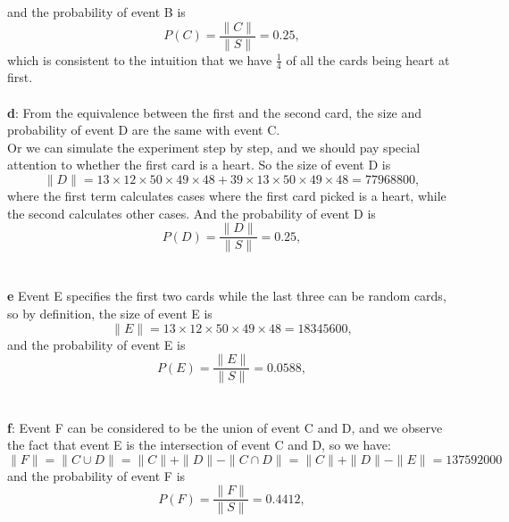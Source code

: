 \documentclass[12pt,letterpaper]{article}
\begin{document}
    and the probability of event B is
        \begin{equation}
            P(C) = \frac{\|C\|}{\|S\|} = 0.25,
        \end{equation}
    which is consistent to the intuition that we have $\frac{1}{4}$ of all the cards being heart at first.
    \\ \\
    \textbf{d}: From the equivalence between the first and the second card, the size and probability of event D are the same with event C.\\
    Or we can simulate the experiment step by step, and we should pay special attention to whether the first card is a heart. So the size of event D is
        \begin{equation}
            \|D\| = 13 \times 12 \times 50 \times 49 \times 48 + 39 \times 13 \times 50 \times 49 \times 48 = 77968800,
        \end{equation}
    where the first term calculates cases where the first card picked is a heart, while the second calculates other cases. And the probability of event D is
        \begin{equation}
            P(D) = \frac{\|D\|}{\|S\|} = 0.25,
        \end{equation}
    \\ \\
    \textbf{e} Event E specifies the first two cards while the last three can be random cards, so by definition, the size of event E is
        \begin{equation}
            \|E\| = 13 \times 12 \times 50 \times 49 \times 48 = 18345600,
        \end{equation}
    and the probability of event E is
       \begin{equation}
           P(E) = \frac{\|E\|}{\|S\|} = 0.0588,
       \end{equation}
    \\ \\
    \textbf{f}: Event F can be considered to be the union of event C and D, and we observe the fact that event E is the intersection of event C and D, so we have:
        \begin{equation}
            \|F\| = \|C \cup D\| = \|C\| + \|D\| - \|C \cap D\| = \|C\| + \|D\| - \|E\| = 137592000
        \end{equation}
    and the probability of event F is
       \begin{equation}
           P(F) = \frac{\|F\|}{\|S\|} = 0.4412,
       \end{equation}
\end{document}
